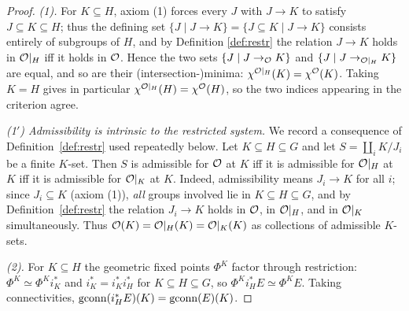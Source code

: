 \begin{proof}
\emph{(1).} For $K\subseteq H$, axiom (1) forces every $J$ with $J\to K$ to satisfy
$J\subseteq K\subseteq H$; thus the defining set
$\{J\mid J\to K\}=\{J\subseteq K\mid J\to K\}$ consists entirely of subgroups of $H$,
and by Definition \ref{def:restr} the relation $J\to K$ holds in $\mathcal{O}|_H$ iff it
holds in $\mathcal{O}$. Hence the two sets $\{J\mid J\to_{\mathcal{O}}K\}$ and
$\{J\mid J\to_{\mathcal{O}|_H}K\}$ are equal, and so are their (intersection-)minima:
$\chi^{\mathcal{O}|_H}(K)=\chi^{\mathcal{O}}(K)$. Taking $K=H$ gives in particular
$\chi^{\mathcal{O}|_H}(H)=\chi^{\mathcal{O}}(H)$, so the two indices appearing in the criterion
agree.

\emph{(1$'$) Admissibility is intrinsic to the restricted system.} We record a
consequence of Definition~\ref{def:restr} used repeatedly below. Let $K\subseteq H
\subseteq G$ and let $S=\coprod_i K/J_i$ be a finite $K$-set. Then $S$ is
admissible for $\mathcal{O}$ at $K$ iff it is admissible for $\mathcal{O}|_H$ at $K$ iff it
is admissible for $\mathcal{O}|_K$ at $K$. Indeed, admissibility means $J_i\to K$ for
all $i$; since $J_i\subseteq K$ (axiom (1)), \emph{all} groups involved lie in
$K\subseteq H\subseteq G$, and by Definition~\ref{def:restr} the relation $J_i\to K$
holds in $\mathcal{O}$, in $\mathcal{O}|_H$, and in $\mathcal{O}|_K$ simultaneously. Thus
$\mathcal{O}(K)=\mathcal{O}|_H(K)=\mathcal{O}|_K(K)$ as collections of admissible $K$-sets.

\emph{(2).} For $K\subseteq H$ the geometric fixed points $\Phi^K$ factor through
restriction: $\Phi^K\simeq\Phi^K i_K^\ast$ and $i_K^\ast=i_K^\ast i_H^\ast$ for
$K\subseteq H\subseteq G$, so $\Phi^K i_H^\ast E\simeq\Phi^K E$. Taking connectivities,
$\operatorname{gconn}(i_H^\ast E)(K)=\operatorname{gconn}(E)(K)$.


\end{proof}
